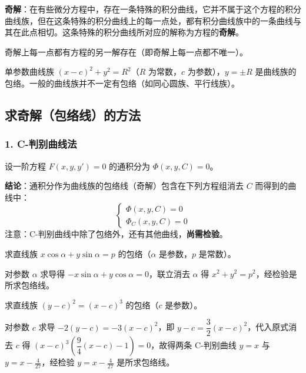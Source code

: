 \textbf{奇解}：在有些微分方程中，存在一条特殊的积分曲线，它并不属于这个方程的积分曲线族，但在这条特殊的积分曲线上的每一点处，都有积分曲线族中的一条曲线与其在此点相切。这条特殊的积分曲线所对应的解称为方程的\textbf{奇解}。

\begin{remark}
奇解上每一点都有方程的另一解存在（即奇解上每一点都不唯一）。
\end{remark}

\begin{example}
单参数曲线族 $(x - c)^2 + y^2 = R^2$（$R$ 为常数，$c$ 为参数），$y = \pm R$ 是曲线族的包络。一般的曲线族并不一定有包络（如同心圆族、平行线族）。
\end{example}

\subsection{求奇解（包络线）的方法}

\subsubsection{1. C-判别曲线法}

设一阶方程 $F(x, y, y') = 0$ 的通积分为 $\Phi(x, y, C) = 0$。

\textbf{结论}：通积分作为曲线族的包络线（奇解）包含在下列方程组消去 $C$ 而得到的曲线中：
$$\begin{cases} \Phi(x, y, C) = 0 \\ \Phi_C(x, y, C) = 0 \end{cases}$$
注意：C-判别曲线中除了包络外，还有其他曲线，\textbf{尚需检验}。

\begin{example}
求直线族 $x\cos\alpha + y\sin\alpha = p$ 的包络（$\alpha$ 是参数，$p$ 是常数）。
\end{example}

\begin{solution}
对参数 $\alpha$ 求导得 $-x\sin\alpha + y\cos\alpha = 0$，联立消去 $\alpha$ 得 $x^2 + y^2 = p^2$，经检验是所求包络线。
\end{solution}

\begin{example}
求直线族 $(y - c)^2 = (x - c)^3$ 的包络（$c$ 是参数）。
\end{example}

\begin{solution}
对参数 $c$ 求导 $-2(y-c) = -3(x-c)^2$，即 $y-c = \dfrac{3}{2}(x-c)^2$，代入原式消去 $c$ 得 $(x-c)^3\left(\dfrac{9}{4}(x-c)-1\right) = 0$，故得两条 C-判别曲线 $y = x$ 与 $y = x - \frac{4}{27}$，经检验 $y = x - \frac{4}{27}$ 是所求包络线。
\end{solution}

